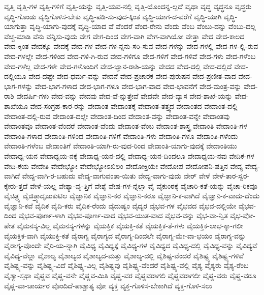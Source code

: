 {ವೃತ್ತಿ
ವೃತ್ತಿ-ಗಳ
ವೃತ್ತಿ-ಗಳಿಗೆ
ವೃತ್ತಿ-ಯನ್ನು
ವೃತ್ತಿ-ಯವ-ನಲ್ಲಿ
ವೃತ್ತಿ-ಯೊಂದನ್ನ-ಲ್ಲದೆ
ವೃಥಾ
ವೃದ್ಧ
ವೃದ್ಧನೂ
ವೃದ್ಧರು
ವೃದ್ಧಿ-ಗೊಂಡು
ವೃದ್ಧಿಗೊಳಿಸ-ಬೇಕು
ವೃದ್ಧಿ-ಪಡಿ-ಸು-ವುದ-ಕ್ಕಿಂತ
ವೃದ್ಧಿ-ಯಾಗ-ದ-ವರೆಗೆ
ವೃದ್ಧಿ-ಯಾಗಿ
ವೃದ್ಧಿ-ಯಾಗುತ್ತಾ
ವೃದ್ಧಿ-ಯಾಗು-ವುದಕ್ಕೆ
ವೃದ್ಧಿ-ಯಾದ
ವೆ
ವೆಂದರೆ
ವೆಂದ-ರೇನು
ವೆಂದು
ವೆಂಬ
ವೆಂಬು-ದನ್ನು
ವೆಂಬು-ದಲ್ಲ
ವೆಚ್ಚ-ಮಾಡಿ
ವೆನು
ವೆನ್ನಿಸು-ವುದು
ವೇಗ
ವೇಗ-ದಿಂದ
ವೇಗ-ವಾಗಿ
ವೇಗ-ವಾಗಿಯೋ
ವೇತ್ತಾ
ವೇದ
ವೇದ-ಕಾಲದ
ವೇದ-ಕ್ಕಿಂತ
ವೇದಕ್ಕೂ
ವೇದಕ್ಕೆ
ವೇದ-ಗಳ
ವೇದ-ಗಳ-ನ್ನನು-ಸರಿ-ಸುವ
ವೇದ-ಗಳನ್ನು
ವೇದ-ಗಳಲ್ಲಿ
ವೇದ-ಗಳ-ಲ್ಲಿ-ರುವ
ವೇದ-ಗಳಲ್ಲೇ
ವೇದ-ಗಳಿಂದ
ವೇದ-ಗಳಿ-ಗಿ-ರುವ
ವೇದ-ಗಳಿಗೂ
ವೇದ-ಗಳಿಗೆ
ವೇದ-ಗಳಿವೆ
ವೇದ-ಗಳು
ವೇದ-ಗಳೆಂಬ
ವೇದ-ಗಳೆಲ್ಲ
ವೇದ-ಗಳೇ
ವೇದ-ಗಳೊಂದಿಗೆ
ವೇದ-ಜ್ಞಾನ-ರಾಶಿ-ಯನ್ನು
ವೇದದ
ವೇದ-ದಲ್ಲಿ
ವೇದ-ದಲ್ಲಿದೆ
ವೇದ-ದಲ್ಲಿಯೂ
ವೇದ-ದಷ್ಟೇ
ವೇದ-ಧರ್ಮ-ವನ್ನು
ವೇದನೆ
ವೇದ-ಪ್ರಚಾರಕ
ವೇದ-ಪುರುಷನ
ವೇದ-ಪ್ರಣೀತ-ವಾದ
ವೇದ-ಭಾಗ-ಗಳನ್ನು
ವೇದ-ಭಾಗ-ಗಳಾದ
ವೇದ-ಭಾಗ-ಗಳೂ
ವೇದ-ಭಾಗ-ವಾದ
ವೇದ-ಭಾವನೆಗೆ
ವೇದ-ಮಂತ್ರ-ವನ್ನು
ವೇದ-ರಾಶಿ
ವೇದರ್ಷಿ-ಗಳು
ವೇದ-ವನ್ನು
ವೇದವು
ವೇದ-ವೆ-ನ್ನುತ್ತೇವೆ
ವೇದವೇ
ವೇದ-ವ್ಯಾಸ
ವೇದ-ಶಾಖೆ-ಯನ್ನು
ವೇದ-ಶಾಖೆಯೂ
ವೇದ-ಸಂಗ್ರಹ-ಕಾರ-ರನ್ನು
ವೇದಾಂತ
ವೇದಾಂತಕ್ಕೆ
ವೇದಾಂತ-ತತ್ತ್ವದ
ವೇದಾಂತದ
ವೇದಾಂತ-ದಲ್ಲಿ
ವೇದಾಂತ-ದಲ್ಲಿ-ರುವ
ವೇದಾಂತ-ದಲ್ಲೇ
ವೇದಾಂತ-ದಿಂದ
ವೇದಾಂತ-ವನ್ನು
ವೇದಾಂತ-ವನ್ನೇ
ವೇದಾಂತವು
ವೇದಾಂತವೂ
ವೇದಾಂತ-ವೆಂದರೆ
ವೇದಾಂತ-ವೆಂದು
ವೇದಾಂತ-ವೆಂಬ
ವೇದಾಂತ-ಶಾಸ್ತ್ರ
ವೇದಾಂತಿ
ವೇದಾಂತಿ-ಗಳ
ವೇದಾಂತಿ-ಗಳಾದ
ವೇದಾಂತಿ-ಗಳಿಂದ
ವೇದಾಂತಿ-ಗಳಿಗೆ
ವೇದಾಂತಿ-ಗಳು
ವೇದಾಂತಿ-ಗಳೂ
ವೇದಾಂತಿ-ಗಳೆಂದು
ವೇದಾಂತಿ-ಗಳೆಂಬ
ವೇದಾಂತಿಗೆ
ವೇದಾಂತಿ-ಯಾಗಿ-ರು-ವುದ-ರಿಂದ
ವೇದಾಂತಿ-ಯಾಗು-ವುದಕ್ಕೆ
ವೇದಾಂತಿಯು
ವೇದಾಧ್ಯ-ಯನ
ವೇದಾಧ್ಯಯ-ನಕ್ಕೆ
ವೇದಾಧ್ಯ-ಯನ-ದಲ್ಲಿ
ವೇದಾಧ್ಯ-ಯನ-ದಿಂದಲೂ
ವೇದಾಧ್ಯಯ-ನವು
ವೇದಿಕೆ-ಗಳ
ವೇದಿ-ಕೆಯ
ವೇದೇತಿ
ವೇದೇಭ್ಯೋ
ವೇದೇಭ್ಯೋಽಖಿಲಂ
ವೇದೋಕ್ತಿಯೇ
ವೇದೋಪ
ವೇದೋಪನಿ-ಷತ್ತಿನ
ವೇದ್ಯ
ವೇದ್ಯ-ವಾಗಿದೆ
ವೇದ್ಯ-ವಾಗಿ-ರ-ಬಹುದು
ವೇದ್ಯ-ವಾಗುವಂತಾ-ಯಿತು
ವೇದ್ಯ-ವಾಗು-ವುದು
ವೇರ್
ವೇಳೆ
ವೇಳೆ-ತಾರ-ಸ್ವರ-ಕ್ಕೇರು-ತ್ತದೆ
ವೇಳೆ-ಯಲ್ಲ
ವೇಶ್ಯಾ-ವೃ-ತ್ತಿಗೆ
ವೇಶ್ಯೆ
ವೇಷ-ಗಳ-ನ್ನೆಲ್ಲಾ
ವೈ
ವೈಕುಂಠಕ್ಕೆ
ವೈಚಾರಿ-ಕತೆ-ಯನ್ನು
ವೈಚಾ-ರಿಕವೂ
ವೈಚಿತ್ರ್ಯ
ವೈಚಿತ್ರ್ಯಾದೃಜುಕುಟಿಲ
ವೈಜ್ಞಾನಿಕ
ವೈಜ್ಞಾನಿ-ಕರ
ವೈಜ್ಞಾನಿ-ಕರೂ
ವೈಜ್ಞಾನಿ-ಕ-ವಾಗಿದೆ
ವೈಜ್ಞಾನಿ-ಕ-ವಾದು-ದೆಂದು
ವೈಜ್ಞಾನಿ-ಕವೆ
ವೈದಿಕ
ವೈದಿ-ಕರು
ವೈದಿಕ-ರೆಂದು
ವೈದುಷ್ಯಂ
ವೈದ್ಯರ
ವೈಭವ-ಗಳ
ವೈಭವದ
ವೈಭವ-ದಲ್ಲಿಯೇ
ವೈಭವ-ದಿಂದ
ವೈಭವ-ಪೂರ್ಣ-ಳಾಗಿ
ವೈಭವ-ಪೂರ್ಣ-ವಾದ
ವೈಭವ-ಯುತ-ವಾದ
ವೈಭವ-ವನ್ನು
ವೈಭ-ವಾ-ನ್ವಿತ
ವೈಭ-ವೋ-ಪೇತ
ವೈಮನಸ್ಯ-ವಿಲ್ಲ
ವೈಮನಸ್ಯ-ಗಳನ್ನು
ವೈಯಕ್ತಿಕ
ವೈಯಕ್ತಿ-ಕತೆ
ವೈಯಕ್ತಿಕ-ತೆ-ಗಳು
ವೈಯಕ್ತಿಕ-ಲಾಭ-ಕ್ಕಾ-ಗಲೀ
ವೈಯಕ್ತಿಕ-ವಾಗಿ
ವೈಯುಕ್ತಿ-ಕತೆ
ವೈರಾಗ್ಯ
ವೈರಾಗ್ಯದ
ವೈರಾಗ್ಯ-ದಿಂದಲೇ
ವೈರಾಗ್ಯ-ಮೇ-ವಾ-ಭಯಂ
ವೈರಾಗ್ಯ-ವನ್ನು
ವೈರಾಗ್ಯ-ವೊಂದೇ
ವೈರಿ-ಯ-ನ್ನಾಗಿ
ವೈವಿಧ್ಯ
ವೈವಿಧ್ಯಕ್ಕೆ
ವೈವಿಧ್ಯ-ಗಳ
ವೈವಿಧ್ಯದ
ವೈವಿಧ್ಯ-ದಲ್ಲಿ
ವೈವಿಧ್ಯ-ವನ್ನು
ವೈವಿಧ್ಯವೆ
ವೈವಿಧ್ಯ-ವೆಲ್ಲಾ
ವೈಶಾಲ್ಯ
ವೈಶಾಲ್ಯದ
ವೈಶಾಲ್ಯದ-ಮತ್ತು
ವೈಶಾಲ್ಯ-ದಲ್ಲಿ
ವೈಶಿಷ್ಟ-ವೆಂದರೆ
ವೈಶಿಷ್ಟ್ಯ
ವೈಶಿಷ್ಟ್ಯ-ಗಳಿವೆ
ವೈಶಿಷ್ಟ್ಯ-ವನ್ನು
ವೈಶಿಷ್ಟ್ಯ-ವಿದೆ
ವೈಶಿಷ್ಟ್ಯ-ವಿಲ್ಲ
ವೈಶಿಷ್ಟ್ಯವು
ವೈಶಿಷ್ಟ್ಯ-ವೆಂದರೆ
ವೈಶಿಷ್ಟ್ಯ-ವೆಲ್ಲಿ
ವೈಶ್ಯ
ವೈಶ್ಯರು
ವೈಶ್ಯ-ರೆಂಬ
ವೈಶ್ಯಾ-ಸ್ತಥಾ
ವೈಷ್ಣವ
ವೈಷ್ಣ-ವನೇ
ವೈಷ್ಣವ-ಮಿತಿ
ವೈಷ್ಣ-ವರ
ವೈಷ್ಣವರಾಗಲಿ
ವೈಷ್ಣವರಾಗಲೀ
ವೈಷ್ಣ-ವರು
ವೈಷ್ಣ-ವರೂ
ವೈಷ್ಣ-ವಾ-ಚಾರ್ಯರ
ವೊಂದಿದೆ-ಪಾಶ್ಚಾತ್ಯ
ವೋ
ವ್ಯಕ್ತ
ವ್ಯಕ್ತ-ಗೊಳಿಸ-ಬೇಕಾಗಿದೆ
ವ್ಯಕ್ತ-ಗೊಳಿ-ಸಲು
}
